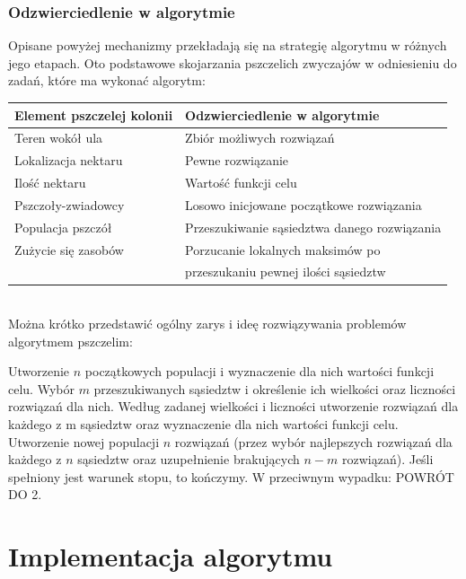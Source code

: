 \documentclass[a4paper,12pt,notitlepage]{mwrep}
\begin{document}
\subsection{Odzwierciedlenie w algorytmie}
Opisane powyżej mechanizmy przekładają się na strategię algorytmu w różnych jego etapach.
Oto podstawowe skojarzania pszczelich zwyczajów w odniesieniu do zadań, które ma wykonać algorytm:\\

\begin{tabular}{|l|l|}
\hline
Element pszczelej kolonii & Odzwierciedlenie w algorytmie \\
\hline
Teren wokół ula & Zbiór możliwych rozwiązań \\
Lokalizacja nektaru & Pewne rozwiązanie \\
Ilość nektaru & Wartość funkcji celu \\
Pszczoły-zwiadowcy & Losowo inicjowane początkowe rozwiązania \\
Populacja pszczół & Przeszukiwanie sąsiedztwa danego rozwiązania \\
Zużycie się zasobów & Porzucanie lokalnych maksimów po \\
& przeszukaniu pewnej ilości sąsiedztw \\
\hline
\end{tabular}\\

Można krótko przedstawić ogólny zarys i ideę rozwiązywania problemów algorytmem pszczelim:
\begin{enumerate}
	\fe	Utworzenie $n$ początkowych populacji i wyznaczenie dla nich wartości funkcji celu.
	\fe	Wybór $m$ przeszukiwanych sąsiedztw i określenie ich wielkości oraz liczności rozwiązań dla nich.
	\fe	Według zadanej wielkości i liczności utworzenie rozwiązań dla każdego z m sąsiedztw oraz wyznaczenie dla nich wartości funkcji celu.
	\fe	Utworzenie nowej populacji $n$ rozwiązań (przez wybór najlepszych rozwiązań dla każdego z $n$ sąsiedztw oraz uzupełnienie brakujących $n-m$ rozwiązań).
	\fe	Jeśli spełniony jest warunek stopu, to kończymy. W przeciwnym wypadku: POWRÓT DO 2.
\end{enumerate}

\chapter{Implementacja algorytmu}
\end{document}
